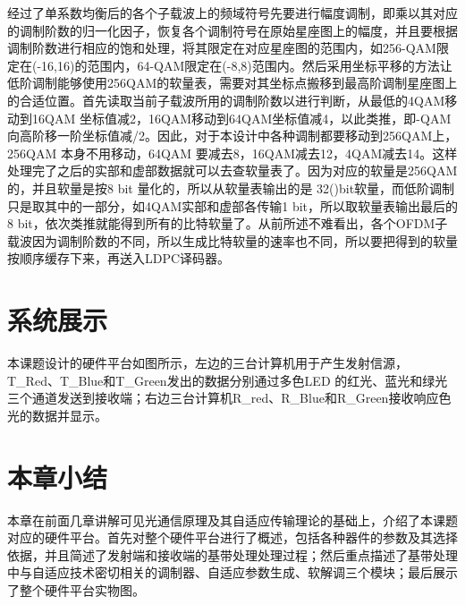 经过了单系数均衡后的各个子载波上的频域符号先要进行幅度调制，即乘以其对应的调制阶数的归一化因子，恢复各个调制符号在原始星座图上的幅度，并且要根据调制阶数进行相应的饱和处理，将其限定在对应星座图的范围内，如256-QAM限定在(-16,16)的范围内，64-QAM限定在(-8,8)范围内。然后采用坐标平移的方法让低阶调制能够使用256QAM的软量表，需要对其坐标点搬移到最高阶调制星座图上的合适位置。首先读取当前子载波所用的调制阶数以进行判断，从最低的4QAM移动到16QAM 坐标值减2，16QAM移动到64QAM坐标值减4，以此类推，即-QAM向高阶移一阶坐标值减/2。因此，对于本设计中各种调制都要移动到256QAM上，256QAM 本身不用移动，64QAM 要减去8，16QAM减去12，4QAM减去14。这样处理完了之后的实部和虚部数据就可以去查软量表了。因为对应的软量是256QAM的，并且软量是按8 bit 量化的，所以从软量表输出的是 32()bit软量，而低阶调制只是取其中的一部分，如4QAM实部和虚部各传输1 bit，所以取软量表输出最后的8 bit，依次类推就能得到所有的比特软量了。从前所述不难看出，各个OFDM子载波因为调制阶数的不同，所以生成比特软量的速率也不同，所以要把得到的软量按顺序缓存下来，再送入LDPC译码器。

\section{系统展示}
本课题设计的硬件平台如图所示，左边的三台计算机用于产生发射信源，T\_Red、T\_Blue和T\_Green发出的数据分别通过多色LED 的红光、蓝光和绿光三个通道发送到接收端；右边三台计算机R\_red、R\_Blue和R\_Green接收响应色光的数据并显示。





\section{本章小结}
本章在前面几章讲解可见光通信原理及其自适应传输理论的基础上，介绍了本课题对应的硬件平台。首先对整个硬件平台进行了概述，包括各种器件的参数及其选择依据，并且简述了发射端和接收端的基带处理处理过程；然后重点描述了基带处理中与自适应技术密切相关的调制器、自适应参数生成、软解调三个模块；最后展示了整个硬件平台实物图。
